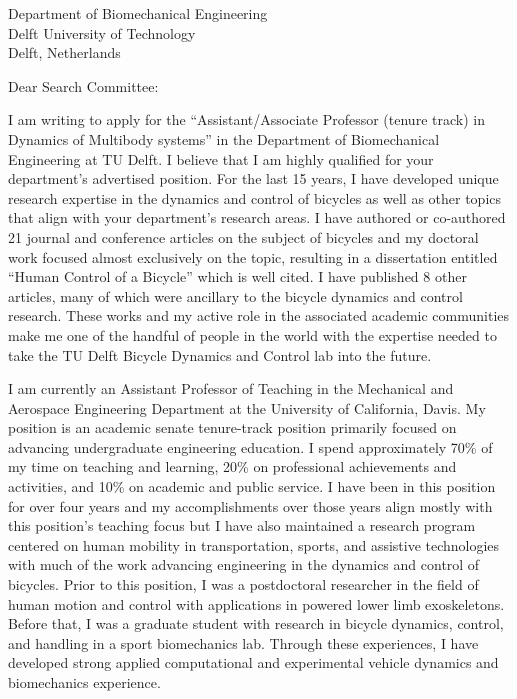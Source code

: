 \documentclass{letter}
\date{}
\begin{document}
\begin{letter}{
  Department of Biomechanical Engineering \\
  Delft University of Technology \\
  Delft, Netherlands
}

\opening{Dear Search Committee:}

I am writing to apply for the ``Assistant/Associate Professor (tenure track) in
Dynamics of Multibody systems'' in the Department of Biomechanical Engineering
at TU Delft. I believe that I am highly qualified for your department's
advertised position. For the last 15 years, I have developed unique research
expertise in the dynamics and control of bicycles as well as other topics that
align with your department's research areas. I have authored or co-authored 21
journal and conference articles on the subject of bicycles and my doctoral work
focused almost exclusively on the topic, resulting in a dissertation entitled
``Human Control of a Bicycle'' which is well cited. I have published 8 other
articles, many of which were ancillary to the bicycle dynamics and control
research. These works and my active role in the associated academic communities
make me one of the handful of people in the world with the expertise needed to
take the TU Delft Bicycle Dynamics and Control lab into the future.

I am currently an Assistant Professor of Teaching in the Mechanical and
Aerospace Engineering Department at the University of California, Davis. My
position is an academic senate tenure-track position primarily focused on
advancing undergraduate engineering education. I spend approximately 70\% of my
time on teaching and learning, 20\% on professional achievements and
activities, and 10\% on academic and public service. I have been in this
position for over four years and my accomplishments over those years align
mostly with this position's teaching focus but I have also maintained a
research program centered on human mobility in transportation, sports, and
assistive technologies with much of the work advancing engineering in the
dynamics and control of bicycles. Prior to this position, I was a postdoctoral
researcher in the field of human motion and control with applications in
powered lower limb exoskeletons. Before that, I was a graduate student with
research in bicycle dynamics, control, and handling in a sport biomechanics
lab. Through these experiences, I have developed strong applied computational
and experimental vehicle dynamics and biomechanics experience.


\end{letter}
\end{document}
